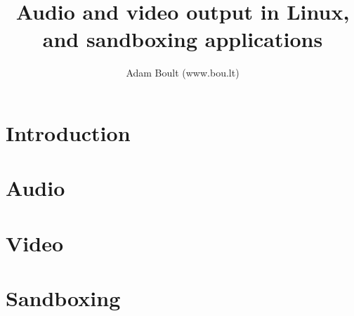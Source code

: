 \documentclass[oneside]{book}
\begin{document}
\author{Adam Boult (www.bou.lt)}
\title{Audio and video output in Linux, and sandboxing applications}
\maketitle

\setcounter{tocdepth}{0}
\tableofcontents



\part{Introduction}

\part{Audio}


\part{Video}


\part{Sandboxing}

\end{document}
